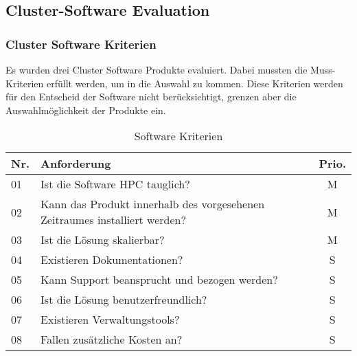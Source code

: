 \subsection{Cluster-Software Evaluation}
\subsubsection{Cluster Software Kriterien}
Es wurden drei Cluster Software Produkte evaluiert. Dabei mussten die Muss-Kriterien erfüllt werden, um in die Auswahl zu kommen. Diese Kriterien werden für den Entscheid der Software nicht berücksichtigt, grenzen aber die Auswahlmöglichkeit der Produkte ein.

\begin{table}[H]
\begin{tabular}[t]{p{0.7cm}|p{14cm}c}
\hline
\rowcolor{heading}\textbf{Nr.} & \textbf{Anforderung} & \textbf{Prio.} \\\hline
01 & Ist die Software HPC tauglich? & M \\\hline
02 & Kann das Produkt innerhalb des vorgesehenen Zeitraumes installiert werden? & M \\\hline
03 & Ist die Lösung skalierbar? &  M \\\hline
04 & Existieren Dokumentationen? & S \\\hline
05 & Kann Support beansprucht und bezogen werden? & S \\\hline
06 & Ist die Lösung benutzerfreundlich? & S \\\hline
07 & Existieren Verwaltungstools? & S \\\hline
08 & Fallen zusätzliche Kosten an? & S \\\hline
\end{tabular}
\caption{Software Kriterien}
\end{table}

